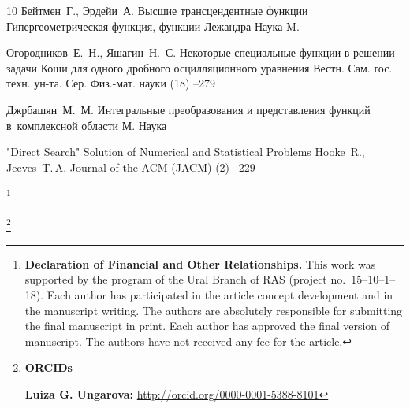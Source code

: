 \begin{thebibliography}{10}
\by Бейтмен~Г., Эрдейи~А.
\book Высшие трансцендентные функции
\voltitle Гипергеометрическая функция, функции Лежандра
\publ Наука
\publaddr M.

\by Огородников~Е.~Н., Яшагин~Н.~С.
\paper Некоторые специальные функции в решении задачи Коши для одного дробного осцилляционного уравнения
\jour Вестн. Сам. гос. техн. ун-та. Сер. Физ.-мат. науки
(18)
--279

\by Джрбашян~М.~М.
\book Интегральные преобразования и представления функций в~комплексной области
\publaddr М.
\publ Наука

\paper  "Direct Search" Solution of Numerical and Statistical Problems
\by Hooke~R.,  Jeeves~T.\,A.
\jour Journal of the ACM (JACM)
(2)
--229


\end{thebibliography}

\RuDate




\newpage

\makeentitle

\thanks{{\bf Declaration of Financial and Other Relationships.}
This work was supported by the program of the Ural Branch of RAS (project no.~15--10--1--18).
Each author has participated in the article concept development and in the manuscript writing.
The authors are absolutely responsible for submitting the final manuscript in print.
Each author has approved the final version of manuscript.
The authors have not received any fee for the article.
}

\pagebreak


\thanks{{\bf ORCIDs}

{\bf Luiza G. Ungarova:} \url{http://orcid.org/0000-0001-5388-8101}
}


